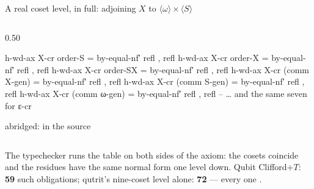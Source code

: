 \begin{frame}{A real coset level, in full: adjoining $X$ to $\langle\omega\rangle\times\langle S\rangle$ \InPaper}
\begin{columns}[T]
\begin{column}{0.50\textwidth}
\begin{code}
  h-wd-ax X-cr order-S = by-equal-nf′ refl , refl
  h-wd-ax X-cr order-X = by-equal-nf′ refl , refl
  h-wd-ax X-cr order-SX = by-equal-nf′ refl , refl
  h-wd-ax X-cr (comm {X-gen}) = by-equal-nf′ refl , refl
  h-wd-ax X-cr (comm {S-gen}) = by-equal-nf′ refl , refl
  h-wd-ax X-cr (comm {ω-gen}) = by-equal-nf′ refl , refl
  -- … and the same seven for ε-cr
\end{code}
{\scriptsize abridged:  in the source}
\end{column}
\end{columns}
\begin{keybox}
\small The typechecker runs the table on both sides of the axiom: the cosets
coincide and the residues have the same normal form one level down.
Qubit Clifford+$T$: \textbf{59} such obligations; qutrit's nine-coset level
alone: \textbf{72} --- every one .
\end{keybox}
\end{frame}

